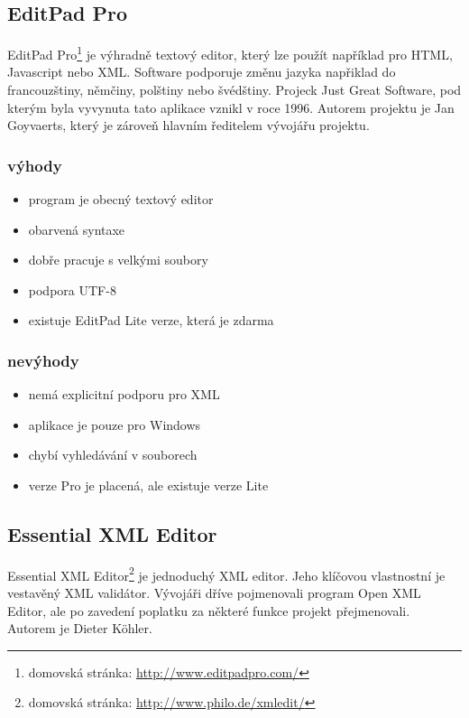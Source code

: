         \subsection{EditPad Pro}
            EditPad Pro\footnote{domovská stránka: \url{http://www.editpadpro.com/}} je výhradně textový editor, který lze použít například pro HTML, Javascript nebo XML. Software podporuje změnu jazyka napřiklad do francouzštiny, němčiny, polštiny nebo švédštiny. Projeck Just Great Software, pod kterým byla vyvynuta tato aplikace vznikl v roce 1996. Autorem projektu je Jan Goyvaerts, který je zároveň hlavním ředitelem vývojářu projektu.

            \subsubsection{výhody}
                \begin{itemize}
                    \item program je obecný textový editor
                    \item obarvená syntaxe
                    \item dobře pracuje s velkými soubory
                    \item podpora UTF-8
                    \item existuje EditPad Lite verze, která je zdarma
                \end{itemize}
                
            \subsubsection{nevýhody}
                \begin{itemize}
                    \item nemá explicitní podporu pro XML
                    \item aplikace je pouze pro Windows
                    \item chybí vyhledávání v souborech
                    \item verze Pro je placená, ale existuje verze Lite
                \end{itemize}
                
        \subsection{Essential XML Editor}
            Essential XML Editor\footnote{domovská stránka: \url{http://www.philo.de/xmledit/}} je jednoduchý XML editor. Jeho klíčovou vlastnostní je vestavěný XML validátor. Vývojáři dříve pojmenovali program Open XML Editor, ale po zavedení poplatku za některé funkce projekt přejmenovali. Autorem je Dieter Köhler. 
            
